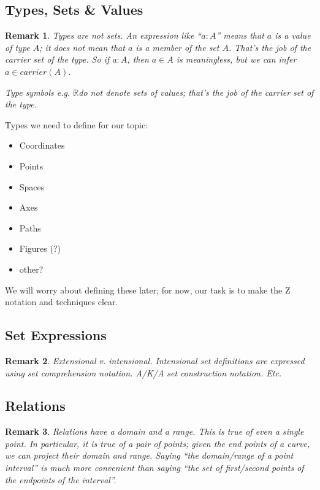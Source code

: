 \documentclass[12pt]{tufte-handout}
\numberwithin{equation}{subsection}
\numberwithin{equation}{subsection}
\newtheorem{remark}{Remark}
\newcommand\R{\(\mathds{R}\)}
\begin{document}
\subsection{Types, Sets \& Values}
\label{sect:types}

\begin{remark}
  Types are not sets. An expression like ``\(a:A\)'' means that \(a\)
  is a value of type \(A\); it does \textit{not} mean that \(a\) is a
  \textit{member} of the set \(A\).  That's the job of the
  \textit{carrier set} of the type.  So if \(a:A\), then \(a\in A\) is
  meaningless, but we can infer \(a\in carrier(A)\).

  Type symbols e.g. \R do not denote sets of values; that's the job of
  the carrier set of the type.
\end{remark}

Types we need to define for our topic:

\begin{itemize}
\item Coordinates
\item Points
\item Spaces
\item Axes
\item Paths
\item Figures (?)
\item other?
\end{itemize}

We will worry about defining these later; for now, our task is to make
the Z notation and techniques clear.

\subsection{Set Expressions}
\label{subs:setcomp}

\begin{remark}
  Extensional v. intensional.  Intensional set definitions are
  expressed using set comprehension notation. A/K/A set construction
  notation.  Etc.
\end{remark}

\subsection{Relations}
\label{subs:relations}

\begin{remark}
  Relations have a domain and a range.  This is true of even a single
  point.  In particular, it is true of a pair of points; given the end
  points of a curve, we can project their domain and range.  Saying
  ``the domain/range of a point interval'' is much more convenient
  than saying ``the set of first/second points of the endpoints of the
  interval''.
\end{remark}
\end{document}
